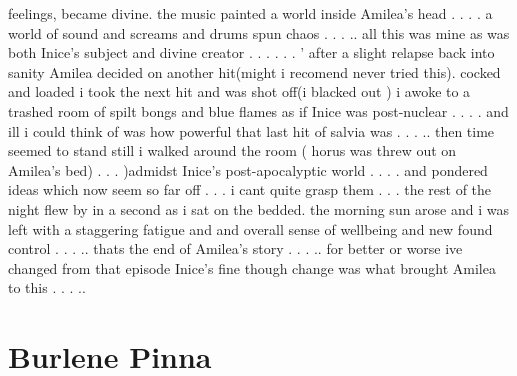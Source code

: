 \documentclass[12pt]{book}
\begin{document}
feelings, became divine. the music painted a world inside Amilea's head . . .  . a world of sound and screams and drums spun chaos . . . .. all this was mine as was both Inice's subject and divine creator . . .   . . .  ' after a slight relapse back into sanity Amilea decided on another hit(might i recomend never tried this). cocked and loaded i took the next hit and was shot off(i blacked out ) i awoke to a trashed room of spilt bongs and blue flames as if Inice was post-nuclear . . .  . and ill i could think of was how powerful that last hit of salvia was . . . .. then time seemed to stand still i walked around the room ( horus was threw out on Amilea's bed) . . .  )admidst Inice's post-apocalyptic world . . .  . and pondered ideas which now seem so far off . . .  i cant quite grasp them . . .  the rest of the night flew by in a second as i sat on the bedded. the morning sun arose and i was left with a staggering fatigue and and overall sense of wellbeing and new found control . . . .. thats the end of Amilea's story . . . .. for better or worse ive changed from that episode Inice's fine though change was what brought Amilea to this . . . ..



\chapter{Burlene Pinna}
\end{document}
